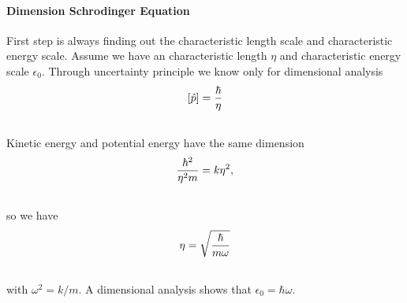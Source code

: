 \documentclass[letterpaper,10pt,english]{sphinxmanual}
\begin{document}
\paragraph{Dimension Schrodinger Equation}
\label{QuantumMechanics:dimension-schrodinger-equation}
First step is always finding out the characteristic length scale and characteristic energy scale. Assume we have an characteristic length $\eta$ and characteristic energy scale $\epsilon_0$. Through uncertainty principle we know only for dimensional analysis
\begin{gather}
\begin{split}\left[\hat p\right]=\frac{\hbar}{\eta}\end{split}\notag\\\begin{split}\end{split}\notag
\end{gather}
Kinetic energy and potential energy have the same dimension
\begin{gather}
\begin{split}\frac{\hbar^2}{\eta^2 m}=k \eta^2 ,\end{split}\notag\\\begin{split}\end{split}\notag
\end{gather}
so we have
\begin{gather}
\begin{split}\eta = \sqrt{\frac{\hbar}{m\omega}}\end{split}\notag\\\begin{split}\end{split}\notag
\end{gather}
with $\omega^2=k/m$. A dimensional analysis shows that $\epsilon_0=\hbar\omega$.
\end{document}
